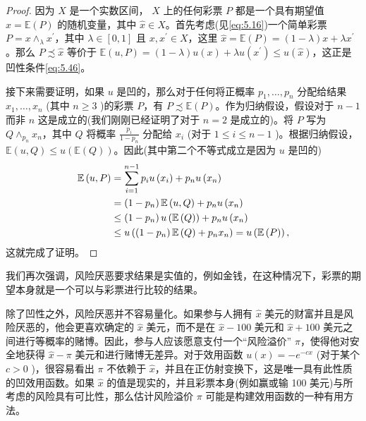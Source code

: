 \begin{proof}
因为 \(X\) 是一个实数区间， \(X\) 上的任何彩票 \(P\) 都是一个具有期望值 \(\widehat{x} = \mathbb{E}\left( P\right)\) 的随机变量，其中 \(\widehat{x} \in  X\)。首先考虑(见\eqref{eq:5.16})一个简单彩票 \(P = x{ \land  }_{\lambda }{x}^{\prime }\)，其中 \(\lambda  \in  \left\lbrack  {0,1}\right\rbrack\) 且 \(x,{x}^{\prime } \in  X\)，这里 \(\widehat{x} = \mathbb{E}\left( P\right)  = \left( {1 - \lambda }\right) x + \lambda {x}^{\prime }\)。那么 \(P \precsim  \widehat{x}\) 等价于 \(\mathbb{E}\left( {u,P}\right)  = \left( {1 - \lambda }\right) u\left( x\right)  + {\lambda u}\left( {x}^{\prime }\right)  \leq  u\left( \widehat{x}\right)\)，这正是凹性条件\eqref{eq:5.46}。

接下来需要证明，如果 \(u\) 是凹的，那么对于任何将正概率 \({p}_{1},\ldots ,{p}_{n}\) 分配给结果 \({x}_{1},\ldots ,{x}_{n}\) (其中 \(n \geq  3\) )的彩票 \(P\)，有 \(P \precsim  \mathbb{E}\left( P\right)\)。作为归纳假设，假设对于 \(n - 1\) 而非 \(n\) 这是成立的(我们刚刚已经证明了对于 \(n = 2\) 是成立的)。将 \(P\) 写为 \(Q{ \land  }_{{p}_{n}}{x}_{n}\)，其中 \(Q\) 将概率 \(\frac{{p}_{i}}{1 - {p}_{n}}\) 分配给 \({x}_{i}\) (对于 \(1 \leq  i \leq  n - 1\) )。根据归纳假设， \(\mathbb{E}\left( {u,Q}\right)  \leq  u\left( {\mathbb{E}\left( Q\right) }\right)\)。因此(其中第二个不等式成立是因为 \(u\) 是凹的)
\begin{align}
\mathbb{E}\left( {u,P}\right) &= \mathop{\sum }\limits_{{i = 1}}^{{n - 1}}{p}_{i}u\left( {x}_{i}\right)  + {p}_{n}u\left( {x}_{n}\right) \notag \\
&= \left( {1 - {p}_{n}}\right) \mathbb{E}\left( {u,Q}\right)  + {p}_{n}u\left( {x}_{n}\right)\notag \\
&\leq  \left( {1 - {p}_{n}}\right) u\left( {\mathbb{E}\left( Q\right) }\right)  + {p}_{n}u\left( {x}_{n}\right)\notag \\
&\leq  u\left( {\left( {1 - {p}_{n}}\right) \mathbb{E}\left( Q\right)  + {p}_{n}{x}_{n}}\right)  = u\left( {\mathbb{E}\left( P\right) }\right), \notag
\end{align}
这就完成了证明。
\end{proof}

我们再次强调，风险厌恶要求结果是实值的，例如金钱，在这种情况下，彩票的期望本身就是一个可以与彩票进行比较的结果。

除了凹性之外，风险厌恶并不容易量化。如果参与人拥有 \(\widehat{x}\) 美元的财富并且是风险厌恶的，他会更喜欢确定的 \(\widehat{x}\) 美元，而不是在 \(\widehat{x} - {100}\) 美元和 \(\widehat{x} + {100}\) 美元之间进行等概率的赌博。因此，参与人应该愿意支付一个“风险溢价” \(\pi\)，使得他对安全地获得 \(\widehat{x} - \pi\) 美元和进行赌博无差异。对于效用函数 \(u\left( x\right)  =  - {e}^{-{cx}}\) (对于某个 \(c > 0\) )，很容易看出 \(\pi\) 不依赖于 \(\widehat{x}\)，并且在正仿射变换下，这是唯一具有此性质的凹效用函数。如果 \(\widehat{x}\) 的值是现实的，并且彩票本身(例如赢或输 100 美元)与所考虑的风险具有可比性，那么估计风险溢价 \(\pi\) 可能是构建效用函数的一种有用方法。

